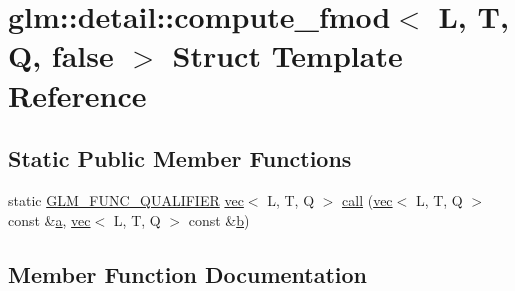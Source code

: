\hypertarget{structglm_1_1detail_1_1compute__fmod_3_01_l_00_01_t_00_01_q_00_01false_01_4}{}\section{glm\+:\+:detail\+:\+:compute\+\_\+fmod$<$ L, T, Q, false $>$ Struct Template Reference}
\label{structglm_1_1detail_1_1compute__fmod_3_01_l_00_01_t_00_01_q_00_01false_01_4}
\subsection*{Static Public Member Functions}
\begin{DoxyCompactItemize}
\item 
static \hyperlink{setup_8hpp_a33fdea6f91c5f834105f7415e2a64407}{G\+L\+M\+\_\+\+F\+U\+N\+C\+\_\+\+Q\+U\+A\+L\+I\+F\+I\+ER} \hyperlink{structglm_1_1vec}{vec}$<$ L, T, Q $>$ \hyperlink{structglm_1_1detail_1_1compute__fmod_3_01_l_00_01_t_00_01_q_00_01false_01_4_acaf9308834aca953f992553e0ff0a0e0}{call} (\hyperlink{structglm_1_1vec}{vec}$<$ L, T, Q $>$ const \&\hyperlink{_s_d_l__opengl__glext_8h_a3309789fc188587d666cda5ece79cf82}{a}, \hyperlink{structglm_1_1vec}{vec}$<$ L, T, Q $>$ const \&\hyperlink{_s_d_l__opengl__glext_8h_a0f71581a41fd2264c8944126dabbd010}{b})
\end{DoxyCompactItemize}


\subsection{Member Function Documentation}
\mbox{\label{structglm_1_1detail_1_1compute__fmod_3_01_l_00_01_t_00_01_q_00_01false_01_4_acaf9308834aca953f992553e0ff0a0e0}} 
